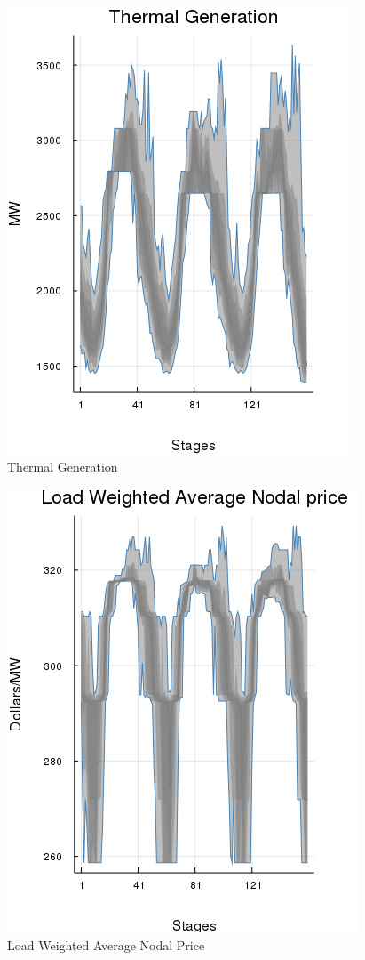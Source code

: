 \documentclass{juliacon}
\begin{document}
\begin{figure}[H]
\centerline{\includegraphics[width=0.5\linewidth]{fig/plot_agg_result_thermal.png}}
\label{fig:plot_agg_result_thermal}
\caption{Thermal Generation}
\end{figure}

\begin{figure}[H]
\centerline{\includegraphics[width=0.55\linewidth]{fig/plot_agg_result_load.png}}
\caption{Load Weighted Average Nodal Price}
\label{fig:plot_agg_result_load}
\end{figure}
\end{document}
